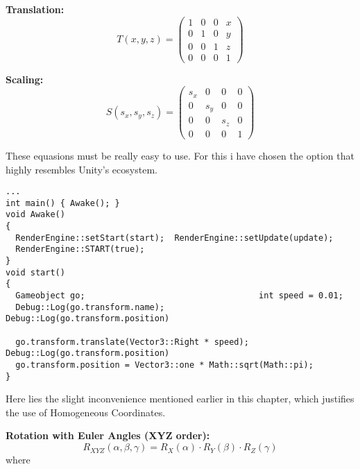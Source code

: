 \begin{minipage}[t]{0.5\textwidth}
    \textbf{Translation:}
    \[
    T(x, y, z) = \begin{pmatrix}
    1 & 0 & 0 & x \\
    0 & 1 & 0 & y \\
    0 & 0 & 1 & z \\
    0 & 0 & 0 & 1
    \end{pmatrix}
    \]
\end{minipage}%
\begin{minipage}[t]{0.5\textwidth}
    \textbf{Scaling:}
    \[
    S(s_x, s_y, s_z) = \begin{pmatrix}
    s_x & 0 & 0 & 0 \\
    0 & s_y & 0 & 0 \\
    0 & 0 & s_z & 0 \\
    0 & 0 & 0 & 1
    \end{pmatrix}
    \]
\end{minipage}

These equasions must be really easy to use. 
For this i have chosen the option that highly resembles Unity's ecosystem.


\begin{lstlisting}[caption={\href{https://www.github.com}{source-code}}]
...
int main() { Awake(); }
void Awake() 
{
  RenderEngine::setStart(start);  RenderEngine::setUpdate(update);
  RenderEngine::START(true);
}
void start() 
{
  Gameobject go;                                   int speed = 0.01;
  Debug::Log(go.transform.name);                   Debug::Log(go.transform.position)
  
  go.transform.translate(Vector3::Right * speed);  Debug::Log(go.transform.position)
  go.transform.position = Vector3::one * Math::sqrt(Math::pi);  
}
\end{lstlisting}





Here lies the slight inconvenience mentioned earlier in this chapter, which justifies the use of Homogeneous Coordinates.


\textbf{Rotation with Euler Angles (XYZ order):}
\begin{equation}
    R_{XYZ}(\alpha, \beta, \gamma) = R_X(\alpha) \cdot R_Y(\beta) \cdot R_Z(\gamma)
\end{equation}
where

